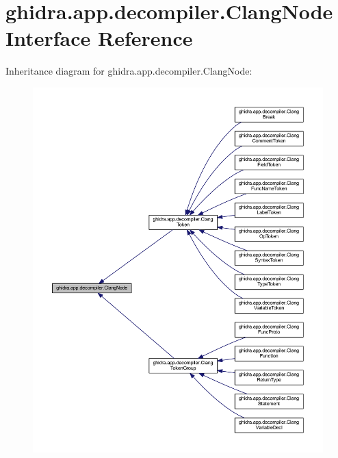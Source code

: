 \hypertarget{interfaceghidra_1_1app_1_1decompiler_1_1_clang_node}{}\section{ghidra.\+app.\+decompiler.\+Clang\+Node Interface Reference}
\label{interfaceghidra_1_1app_1_1decompiler_1_1_clang_node}


Inheritance diagram for ghidra.\+app.\+decompiler.\+Clang\+Node\+:
\nopagebreak
\begin{figure}[H]
\begin{center}
\leavevmode
\includegraphics[width=350pt]{interfaceghidra_1_1app_1_1decompiler_1_1_clang_node__inherit__graph}
\end{center}
\end{figure}
